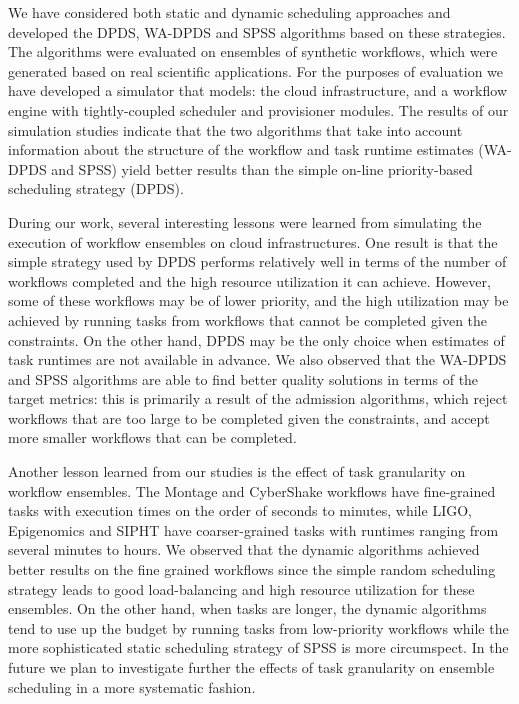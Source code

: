 \documentclass[conference]{IEEEtran}
\begin{document}
We have considered both static and dynamic scheduling approaches and
developed the DPDS, WA-DPDS and SPSS algorithms based on these
strategies. The algorithms were evaluated on ensembles of synthetic
workflows, which were generated based on real scientific applications. For
the purposes of evaluation we have developed a simulator that models: the
cloud infrastructure, and a workflow engine with tightly-coupled scheduler
and provisioner modules. The results of our simulation studies indicate
that the two algorithms that take into account information about the
structure of the workflow and task runtime estimates (WA-DPDS and SPSS)
yield better results than the simple on-line priority-based scheduling
strategy (DPDS).

During our work, several interesting lessons were learned from simulating the execution of
workflow ensembles on cloud infrastructures. One result is that the simple
strategy used by DPDS performs relatively well in terms of the number of
workflows completed and the high resource utilization it can achieve. However,
some of these workflows may be of lower priority, and the high utilization
may be achieved by running tasks from workflows that cannot be completed
given the constraints. On the other hand, DPDS may be the only choice when
estimates of task runtimes are not available in advance. We also observed
that the WA-DPDS and SPSS algorithms are able to find better quality
solutions in terms of the target metrics: this is primarily a result of the
admission algorithms, which reject workflows that are too large to be
completed given the constraints, and accept more smaller workflows that
can be completed.

Another lesson learned from our studies is the effect of task granularity on
workflow ensembles. The Montage and CyberShake workflows have fine-grained tasks
with execution times on the order of seconds to minutes, while LIGO, Epigenomics
and SIPHT have coarser-grained tasks with runtimes ranging from several minutes
to hours. We observed that the dynamic algorithms achieved better results on the
fine grained workflows since the simple random scheduling strategy leads to good
load-balancing and high resource utilization for these ensembles. On the other
hand, when tasks are longer, the dynamic algorithms tend to use up the budget by
running tasks from low-priority workflows while the more sophisticated static
scheduling strategy of SPSS is more circumspect. In the future we plan to
investigate further the effects of task granularity on ensemble scheduling in a more
systematic fashion.
\end{document}

